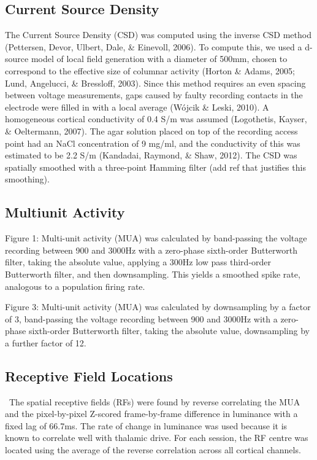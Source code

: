 \documentclass{article}
\begin{document}
\subsection[Current Source Density]{Current Source Density}
The Current Source Density (CSD) was computed using the inverse CSD method (Pettersen, Devor, Ulbert, Dale, \& Einevoll, 2006). To compute this, we used a \textgreek{d-}source model of local field generation with a diameter of 500\textgreek{m}m, chosen to correspond to the effective size of columnar activity (Horton \& Adams, 2005; Lund, Angelucci, \& Bressloff, 2003). Since this method requires an even spacing between voltage measurements, gaps caused by faulty recording contacts in the electrode were filled in with a local average (W\'ojcik \& Leski, 2010). A homogeneous cortical conductivity of 0.4 S/m was assumed (Logothetis, Kayser, \& Oeltermann, 2007). The agar solution placed on top of the recording access point had an NaCl concentration of 9 mg/ml, and the conductivity of this was estimated to be 2.2 S/m (Kandadai, Raymond, \& Shaw, 2012). The CSD was spatially smoothed with a three-point Hamming filter (add ref that justifies this smoothing).

\subsection{Multiunit Activity }
Figure 1: Multi-unit activity (MUA) was calculated by band-passing the voltage recording between 900 and 3000Hz with a zero-phase sixth-order Butterworth filter, taking the absolute value, applying a 300Hz low pass third-order Butterworth filter, and then downsampling. This yields a smoothed spike rate, analogous to a population firing rate.

Figure 3: Multi-unit activity (MUA) was calculated by downsampling by a factor of 3, band-passing the voltage recording between 900 and 3000Hz with a zero-phase sixth-order Butterworth filter, taking the absolute value, downsampling by a further factor of 12.

\subsection{Receptive Field Locations}
\ The spatial receptive fields (RFs) were found by reverse correlating the MUA and the pixel-by-pixel Z-scored frame-by-frame difference in luminance with a fixed lag of 66.7ms. The rate of change in luminance was used because it is known to correlate well with thalamic drive. For each session, the RF centre was located using the average of the reverse correlation across all cortical channels.
\end{document}
